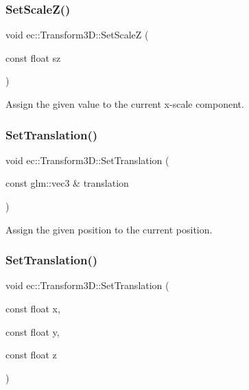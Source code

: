 \subsubsection{\texorpdfstring{Set\+Scale\+Z()}{SetScaleZ()}}
{\footnotesize\ttfamily void ec\+::\+Transform3\+D\+::\+Set\+ScaleZ (\begin{DoxyParamCaption}\item[{const float}]{sz }\end{DoxyParamCaption})}

Assign the given value to the current x-\/scale component. \mbox{\label{classec_1_1_transform3_d_a3a2ebde1bdb7b79e080deaee7555e251}} 
\subsubsection{\texorpdfstring{Set\+Translation()}{SetTranslation()}\hspace{0.1cm}{\footnotesize\ttfamily [1/2]}}
{\footnotesize\ttfamily void ec\+::\+Transform3\+D\+::\+Set\+Translation (\begin{DoxyParamCaption}\item[{const glm\+::vec3 \&}]{translation }\end{DoxyParamCaption})}

Assign the given position to the current position. \mbox{\label{classec_1_1_transform3_d_a14c627a2eea894334e652ba9046bdcae}} 
\subsubsection{\texorpdfstring{Set\+Translation()}{SetTranslation()}\hspace{0.1cm}{\footnotesize\ttfamily [2/2]}}
{\footnotesize\ttfamily void ec\+::\+Transform3\+D\+::\+Set\+Translation (\begin{DoxyParamCaption}\item[{const float}]{x,  }\item[{const float}]{y,  }\item[{const float}]{z }\end{DoxyParamCaption})}

